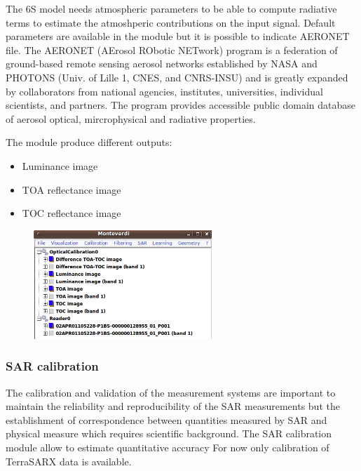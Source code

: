 The 6S model needs atmospheric parameters to be able to compute
radiative terms to estimate the atmoshperic contributions on the input
signal. Default parameters are available in the module but it is
possible to indicate AERONET file. The AERONET (AErosol RObotic
NETwork) program is a federation of ground-based remote sensing
aerosol networks established by NASA and PHOTONS (Univ. of Lille 1,
CNES, and CNRS-INSU) and is greatly expanded by collaborators from
national agencies, institutes, universities, individual scientists,
and partners. The program provides accessible public domain database
of aerosol optical, mircrophysical and radiative properties.

The module produce different outputs:

\begin{itemize}
\item Luminance image
\item TOA reflectance image
\item TOC reflectance image
\end{itemize}


\begin{figure}
  \center
  \includegraphics[width=0.6\textwidth]{../Art/MonteverdiImages/monteverdi_optical_calibration_outputs.png}
  \label{fig:opticalcalibrationoutput}
\end{figure}

\subsubsection{SAR calibration}

The calibration and validation of the measurement systems are
important to maintain the reliability and reproducibility of the SAR
measurements but the establishment of correspondence between
quantities measured by SAR and physical measure which requires
scientific background. The SAR calibration module allow to estimate
quantitative accuracy For now only calibration of TerraSARX data is
available.

